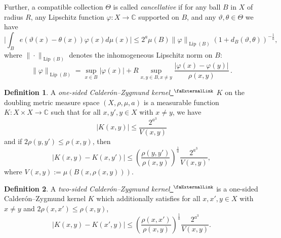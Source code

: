 \documentclass[12pt]{amsart}
\newcommand*{\complex}{\mathbb{C}} %
\newcommand{\extlink}{~\ensuremath{{}^\text{\faExternalLink}}}
\theoremstyle{definition}
\newtheorem{definition}{Definition}[section]
\theoremstyle{plain}
\DeclareMathOperator{\Lip}{\operatorname{Lip}}
\newcommand{\mfa}{{\vartheta}}
\newcommand{\mfb}{{\theta}}
\newcommand{\Mf}{{\Theta}}
\begin{document}
Further, a compatible collection $\Mf$ is called \emph{cancellative} if
for any ball $B$ in $X$ of radius $R$, any Lipschitz function $\varphi\colon X\to \complex$
supported on $B$, and any $\mfa,\mfb\in \Mf$ we have
\begin{equation}
    \Big|\int_B e(\mfa(x)-{\mfb(x)}) \varphi(x) d\mu(x)\Big|\le 2^a \mu(B)\|\varphi\|_{\Lip(B)}
(1+d_B(\mfa,\mfb))^{-\frac{1}{a}},
\end{equation}
where $\|\cdot\|_{\Lip(B)}$ denotes the inhomogeneous Lipschitz norm on $B$:
$$
    \|\varphi\|_{\Lip(B)} = \sup_{x \in B} |\varphi(x)| + R \sup_{x,y \in B, x \neq y} \frac{|\varphi(x) - \varphi(y)|}{\rho(x,y)}\,.
$$

\begin{definition}\label{def:one-sided-kernel}
A \emph{one-sided Calder\'on--Zygmund kernel}\href{https://github.com/fpvandoorn/carleson/blob/020d6e5c71d731952eb0379d222eea4049103ca0/Carleson/Defs.lean#L250}{\extlink} $K$ on the doubling metric measure space $(X, \rho, \mu, a)$
is a measurable function $K:X\times X\to \mathbb{C}$ such that for all $x,y',y\in X$ with $x\neq y$, we have
\begin{equation}
	|K(x,y)| \leq \frac{2^{a^3}}{V(x,y)}
\end{equation}
and if $2\rho(y,y') \leq \rho(x,y)$, then
\begin{equation}
	|K(x,y) - K(x,y')| \leq \left(\frac{\rho(y,y')}{\rho(x,y)}\right)^{\frac{1}{a}}\frac{2^{a^3}}{V(x,y)},
\end{equation}
where $V(x,y):=\mu(B(x,\rho(x,y)))$.
\end{definition}


\begin{definition}\label{def:two-sided-kernel}
A \emph{two-sided Calder\'on--Zygmund kernel}\href{https://github.com/fpvandoorn/carleson/blob/020d6e5c71d731952eb0379d222eea4049103ca0/Carleson/TwoSidedCarleson/WeakCalderonZygmund.lean#L17}{\extlink} is a one-sided Calder\'on--Zygmund kernel $K$ which additionally satisfies for all $x,x',y\in X$ with $x\neq y$ and $2\rho(x,x') \leq \rho(x,y)$,
\begin{equation}
	|K(x,y) - K(x',y)| \leq \left(\frac{\rho(x,x')}{\rho(x,y)}\right)^{\frac{1}{a}}\frac{2^{a^3}}{V(x,y)}.
\end{equation}
\end{definition}
\end{document}
